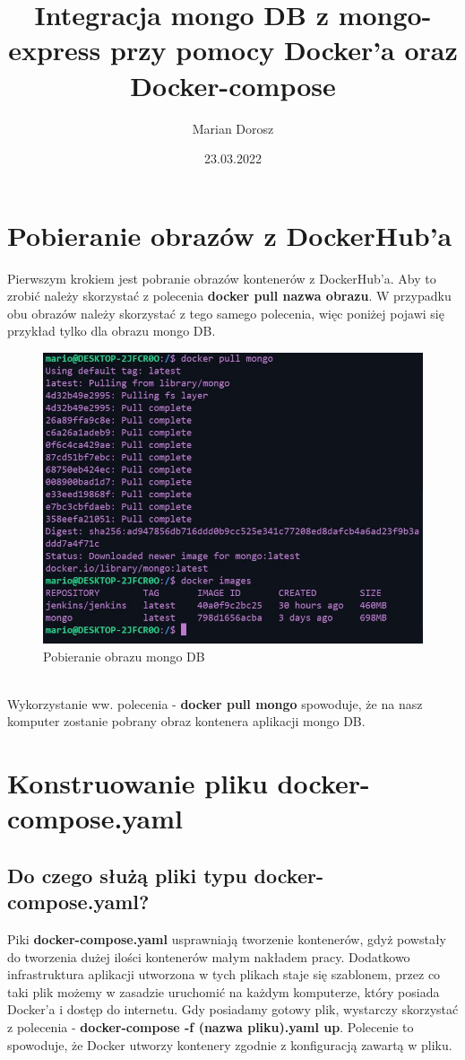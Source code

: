 \documentclass[12pt, a4paper]{article}
\title{Integracja mongo DB z mongo-express przy pomocy Docker'a oraz Docker-compose}
\author{Marian Dorosz}
\date{23.03.2022}
\begin{document}
\maketitle
\newpage

\tableofcontents
\newpage

\listoffigures
\newpage

\section{Pobieranie obrazów z DockerHub'a}
    Pierwszym krokiem jest pobranie obrazów kontenerów z DockerHub'a. Aby to zrobić należy skorzystać z polecenia \textbf{docker pull nazwa obrazu}. W przypadku obu obrazów należy skorzystać z tego samego polecenia, więc poniżej pojawi się przykład tylko dla obrazu mongo DB.
    \begin{figure}[!h]
        \centering
        \includegraphics[width=\textwidth]{docker_pull_mongoDB.JPG}
        \caption{Pobieranie obrazu mongo DB}
        \label{fig:pobieranie_mongoDB}
    \end{figure}
    \\
    Wykorzystanie ww. polecenia - \textbf{docker pull mongo} spowoduje, że na nasz komputer zostanie pobrany obraz kontenera aplikacji mongo DB. 
    
\section{Konstruowanie pliku docker-compose.yaml}
    \subsection{Do czego służą pliki typu docker-compose.yaml?}
        Piki \textbf{docker-compose.yaml} usprawniają tworzenie kontenerów, gdyż powstały do tworzenia dużej ilości kontenerów małym nakładem pracy. Dodatkowo infrastruktura aplikacji utworzona w tych plikach staje się szablonem, przez co taki plik możemy w zasadzie uruchomić na każdym komputerze, który posiada Docker'a i dostęp do internetu. Gdy posiadamy gotowy plik, wystarczy skorzystać z polecenia - \textbf{docker-compose -f (nazwa pliku).yaml up}. Polecenie to spowoduje, że Docker utworzy kontenery zgodnie z konfiguracją zawartą w pliku.  
\end{document}
